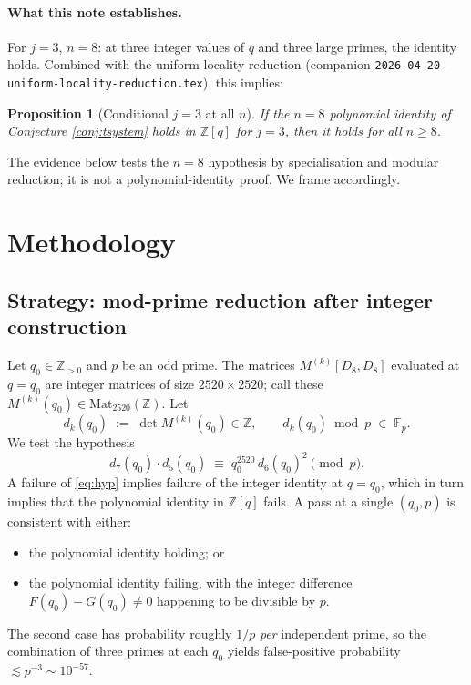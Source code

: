 \documentclass[11pt]{article}
\newtheorem{proposition}[theorem]{Proposition}
\theoremstyle{definition}
\begin{document}
\paragraph{What this note establishes.}  For $j = 3$, $n = 8$: at three integer values of $q$ and three large primes, the identity holds. Combined with the uniform locality reduction (companion \texttt{2026-04-20-uniform-locality-reduction.tex}), this implies:

\begin{proposition}[Conditional $j=3$ at all $n$]\label{prop:cond}
If the $n = 8$ polynomial identity of Conjecture \ref{conj:tsystem} holds in $\mathbb{Z}[q]$ for $j = 3$, then it holds for all $n \geq 8$.
\end{proposition}

The evidence below tests the $n = 8$ hypothesis by specialisation and modular reduction; it is not a polynomial-identity proof. We frame accordingly.

\section{Methodology}

\subsection{Strategy: mod-prime reduction after integer construction}

Let $q_0 \in \mathbb{Z}_{>0}$ and $p$ be an odd prime. The matrices $M^{(k)}[D_8, D_8]$ evaluated at $q = q_0$ are integer matrices of size $2520 \times 2520$; call these $M^{(k)}(q_0) \in \mathrm{Mat}_{2520}(\mathbb{Z})$.  Let
\[
d_k(q_0) \;:=\; \det M^{(k)}(q_0) \in \mathbb{Z}, \qquad
d_k(q_0) \bmod p \;\in\; \mathbb{F}_p.
\]
We test the hypothesis
\begin{equation}\label{eq:hyp}
d_7(q_0) \cdot d_5(q_0) \;\equiv\; q_0^{2520}\, d_6(q_0)^2 \pmod{p}.
\end{equation}
A failure of \eqref{eq:hyp} implies failure of the integer identity at $q = q_0$, which in turn implies that the polynomial identity in $\mathbb{Z}[q]$ fails. A pass at a single $(q_0, p)$ is consistent with either:
\begin{itemize}
\item the polynomial identity holding; or
\item the polynomial identity failing, with the integer difference $F(q_0) - G(q_0) \neq 0$ happening to be divisible by $p$.
\end{itemize}
The second case has probability roughly $1/p$ \emph{per} independent prime, so the combination of three primes at each $q_0$ yields false-positive probability $\lesssim p^{-3} \sim 10^{-57}$.
\end{document}
